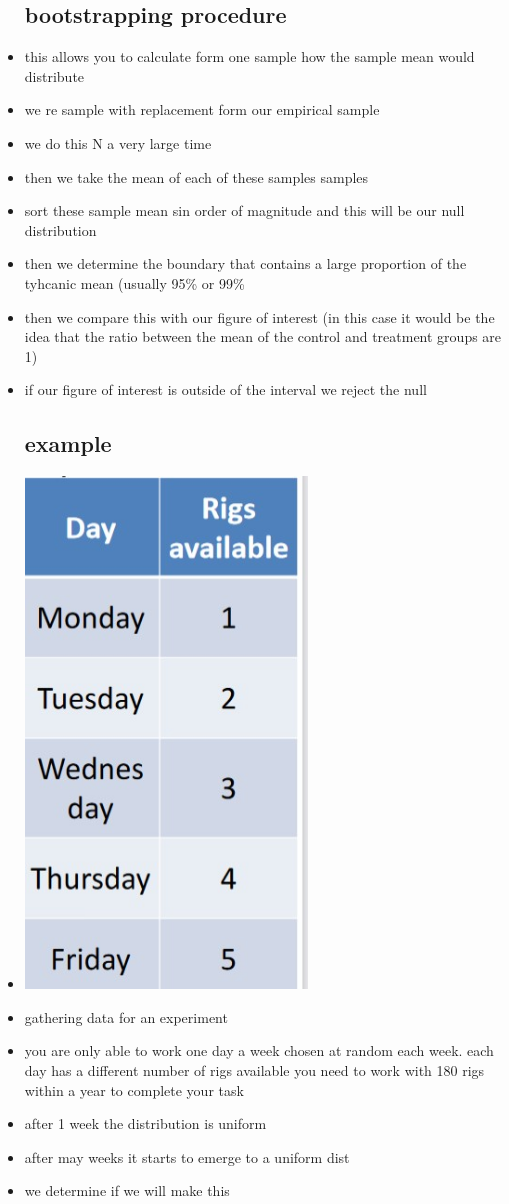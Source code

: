 \documentclass{article}
\begin{document}
\begin{itemize}
\subsection{bootstrapping procedure}
\item this allows you to calculate form one sample how the sample mean would distribute 
\item we re sample with replacement form our empirical sample 
\item we do this N a very large time 
\item then we take the mean of each of these samples samples 
\item sort these sample mean sin order of magnitude and this will be our null distribution 
\item then we determine the boundary that contains a large proportion of the tyhcanic mean (usually 95\% or 99\%
\item then we compare this with our figure of interest (in this case it would be the idea that the ratio between the mean of the control and treatment groups are 1) 
\item if our figure of interest is outside of the interval we reject the null
\subsection{example}
\item \includegraphics[width=7.5cm]{Final_Review/lecture_7/rig_chart.jpg}
\item gathering data for an experiment
\item you are only able to work one day a week chosen at random each week. each day has a different number of rigs available you need to work with 180 rigs within a year to complete your task
\item after 1 week the distribution is uniform 
\item after may weeks it starts to emerge to a uniform dist
\item we determine if we will make this

\end{itemize}
\end{document}
